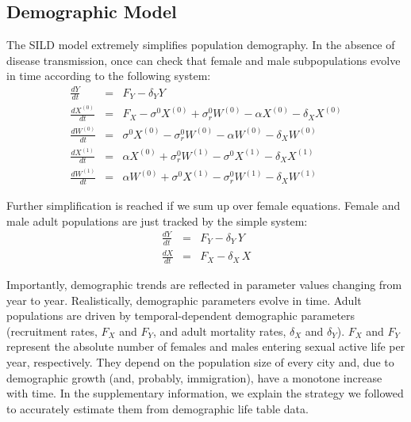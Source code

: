 \documentclass[preprint,12pt]{elsarticle}
\begin{document}
\subsection{Demographic Model}
The SILD model extremely simplifies population demography. In the absence of disease transmission, once can check that female and male subpopulations evolve in time according to the following system:
\begin{eqnarray}
\frac{dY}{dt} & = & F_Y - \delta_Y Y \nonumber\\
\frac{dX^{(0)}}{dt} & = & F_X -\sigma^0 X^{(0)} +\sigma_r^0 W^{(0)} -\alpha X^{(0)} -\delta_X X^{(0)} \nonumber\\
\frac{dW^{(0)}}{dt} & = & \sigma^0 X^{(0)} -\sigma_r^0 W^{(0)} -\alpha W^{(0)} -\delta_X W^{(0)} \nonumber \\
\frac{dX^{(1)}}{dt} & = & \alpha X^{(0)} + \sigma_r^0 W^{(1)} -\sigma^0 X^{(1)} -\delta_X X^{(1)} \nonumber\\
\frac{dW^{(1)}}{dt} & = & \alpha W^{(0)} + \sigma^0 X^{(1)}  -\sigma_r^0 W^{(1)} -\delta_X W^{(1)}
\label{Eq:Demography_0}
\end{eqnarray}

Further simplification is reached if we sum up over female equations. Female and male adult populations are just tracked by the simple system:
\begin{eqnarray}
\frac{dY}{dt} & = & F_Y - \delta_Y \, Y\nonumber\\
\frac{dX}{dt} & = & F_X - \delta_X \, X
\label{Eq:Demography_S}
\end{eqnarray}

Importantly, demographic trends are reflected in parameter values changing from year to year. Realistically, demographic parameters evolve in time. Adult populations are driven by temporal-dependent demographic parameters (recruitment rates, $F_X$ and $F_Y$, and adult mortality rates, $\delta_X$ and $\delta_Y$). $F_X$ and $F_Y$ represent the absolute number of females and males entering sexual active life per year, respectively. They depend on the population size of every city and, due to demographic growth (and, probably, immigration), have a monotone increase with time. In the supplementary information, we explain the strategy we followed to accurately estimate them from demographic life table data. 
\smallskip
\end{document}
